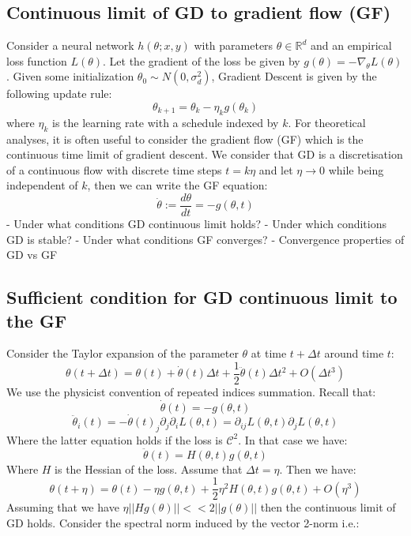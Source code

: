 \documentclass[11pt]{article}
\begin{document}
\subsection*{Continuous limit of GD to gradient flow (GF)}
Consider a neural network $h(\theta; x,y)$ with parameters $\theta \in \mathbb{R}^d$ and an empirical loss function $L(\theta)$. Let the gradient of the loss be given by $g(\theta) = -\nabla_{\theta} L(\theta)$. Given some initialization $\theta_0 \sim N(0, \sigma_d^2)$, Gradient Descent is given by the following update rule:
\begin{equation}
\theta_{k+1} = \theta_k - \eta_k g(\theta_k)
\end{equation}
where $\eta_k$ is the learning rate with a schedule indexed by $k$. For theoretical analyses, it is often useful to consider the gradient flow (GF) which is the continuous time limit of gradient descent. We consider that GD is a discretisation of a continuous flow with discrete time steps $t = k\eta$ and let $\eta \to 0$ while being independent of $k$, then we can write the GF equation:
\begin{equation}
      \dot{\theta} := \frac{d\theta}{dt} = - g(\theta, t)
\end{equation}
- Under what conditions GD continuous limit holds?
- Under which conditions GD is stable?
- Under what conditions GF converges?
- Convergence properties of GD vs GF
\\
\subsection*{Sufficient condition for GD continuous limit to the GF}
Consider the Taylor expansion of the parameter $\theta$ at time $t+\Delta t$ around time $t$:
\begin{equation}
\theta(t+\Delta t) = \theta(t) + \dot{\theta}(t) \Delta t + \frac{1}{2} \ddot{\theta}(t) \Delta t^2 + O(\Delta t^3)
\end{equation}
We use the physicist convention of repeated indices summation. Recall that:
\begin{equation}
\dot{\theta}(t) = - g(\theta, t)
\end{equation}
\begin{equation}
\ddot{\theta}_i(t) = - \dot{\theta}(t)_j \partial_j \partial_i L(\theta, t) = \partial_{ij} L(\theta, t) \partial_j L(\theta, t)
\end{equation}
Where the latter equation holds if the loss is $\mathcal{C}^2$. In that case we have:
\begin{equation}
      \ddot{\theta}(t) =  H(\theta, t) g(\theta, t)
\end{equation}
Where $H$ is the Hessian of the loss. Assume that $\Delta t = \eta$. Then we have:
\begin{equation}
\theta(t+\eta) = \theta(t) - \eta g(\theta, t) + \frac{1}{2} \eta^2 H(\theta, t) g(\theta, t) + O(\eta^3)
\end{equation}
Assuming that we have $\eta||Hg(\theta)|| << 2||g(\theta)||$ then the continuous limit of GD holds. Consider the spectral norm induced by the vector 2-norm i.e.:
\end{document}
